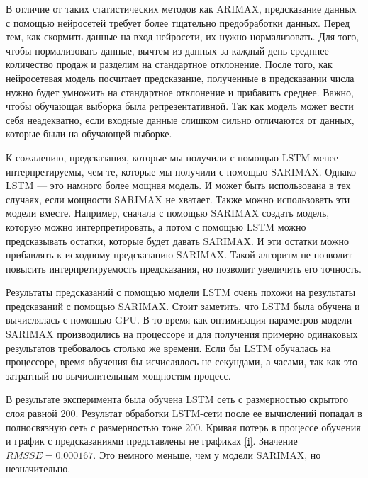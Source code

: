 В отличие от таких статистических методов как ARIMAX, предсказание данных
с помощью нейросетей требует более тщательно предобработки данных.
Перед тем, как скормить данные на вход нейросети, их нужно нормализовать.
Для того, чтобы нормализовать данные, вычтем из данных за каждый день средннее
количество продаж и разделим на стандартное отклонение. После того, как
нейросетевая модель посчитает предсказание, полученные в предсказании
числа нужно будет умножить на стандартное отклонение и прибавить среднее.
Важно, чтобы обучающая выборка была репрезентативной. Так как модель
может вести себя неадекватно, если входные данные слишком сильно отличаются
от данных, которые были на обучающей выборке.

К сожалению, предсказания, которые мы получили с помощью  LSTM менее интерпретируемы,
чем те, которые мы получили с помощью SARIMAX. Однако LSTM --- это намного более
мощная модель. И может быть использована в тех случаях, если мощности SARIMAX не хватает.
Также можно использовать эти модели вместе. Например, сначала с помощью SARIMAX создать
модель, которую можно интерпретировать, а потом с помощью LSTM можно предсказывать остатки, которые будет
давать SARIMAX. И эти остатки можно прибавлять к исходному предсказанию SARIMAX. Такой алгоритм
не позволит повысить интерпретируемость предсказания, но позволит увеличить его точность.

Результаты предсказаний с помощью модели LSTM очень похожи на результаты предсказаний
с помощью SARIMAX. Стоит заметить, что LSTM была обучена и вычислялась с помощью GPU.
В то время как оптимизация параметров модели SARIMAX производились на процессоре и
для получения примерно одинаковых результатов требовалось столько же времени.
Если бы LSTM обучалась на процессоре, время обучения бы исчислялось не секундами, а часами,
так как это затратный по вычислительным мощностям процесс.

В результате эксперимента была обучена LSTM сеть с размерностью скрытого слоя равной 200.
Результат обработки LSTM-сети после ее вычислений попадал в полносвязную сеть с размерностью
тоже 200. Кривая потерь в процессе обучения и график с предсказаниями представлены не графиках \ref{i}.
Значение $ RMSSE = 0.000167 $. Это немного меньше, чем у модели SARIMAX, но незначительно.


